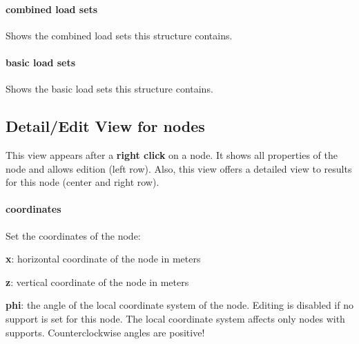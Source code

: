 \documentclass[a4paper,11pt]{report}
\begin{document}
\paragraph{combined load sets}
Shows the combined load sets this structure contains.

\paragraph{basic load sets}
Shows the basic load sets this structure contains.

\subsection{Detail/Edit View for nodes}
\label{sec:nodedetail}



\begin{figure}[H]
\end{figure}

This view appears after a \textbf{right click} on a node. It shows all properties of the node and allows edition (left row). Also, this view offers a detailed view to results for this node (center and right row).

\paragraph{coordinates}
Set the coordinates of the node:
\begin{trivlist}
	\leftskip=1cm
	\item[]\textbf{x}: horizontal coordinate of the node in meters
	\item[]\textbf{z}: vertical coordinate of the node in meters
	\item[]\textbf{phi}: the angle of the local coordinate system of the node. Editing is disabled if no support is set for this node. The local coordinate system affects only nodes with supports. Counterclockwise angles are positive!
\end{trivlist}
\end{document}
